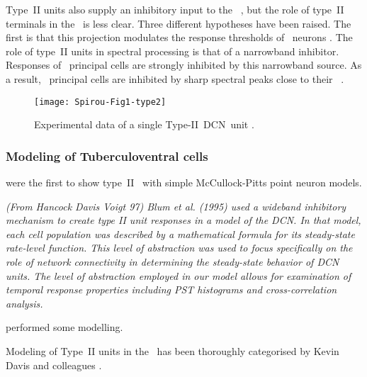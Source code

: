
Type~II units also supply an inhibitory input to the
\VCN~\citep{WickesbergOertel:1990}, but the role of type~II terminals in the
\VCN~is less clear. Three different hypotheses have been raised. The ﬁrst is
that this projection modulates the response thresholds of \VCN~neurons
\citep{PaoliniClark:1998}.  The role of type~II units in spectral processing is
that of a narrowband inhibitor. Responses of \DCN~principal cells are strongly
inhibited by this narrowband source. As a result, \DCN~principal cells are
inhibited by sharp spectral peaks close to their
\BF~\citep{SpirouDavisEtAl:1999}.


\begin{figure}[htb]
  \centering
  \texttt{[image: Spirou-Fig1-type2]}
  \caption[Experimental data of a single Type-II~DCN~unit]{Experimental data of
    a single Type-II~DCN~unit \citep[Fig.~1]{SpirouDavisEtAl:1999}.}
  \label{fig:SpirouFig1}
\end{figure}


\subsubsection{Modeling of Tuberculoventral cells}



\citet{ArleKim:1991a} were the first to show type~II \EIRA~with simple
McCullock-Pitts point neuron models.


{\it (From Hancock Davis Voigt 97) Blum et al. (1995) used a wideband inhibitory
  mechanism to create type II unit responses in a model of the DCN. In that
  model, each cell population was described by a mathematical formula for its
  steady-state rate-level function. This level of abstraction was used to focus
  specifically on the role of network connectivity in determining the
  steady-state behavior of DCN units. The level of abstraction employed in our
  model allows for examination of temporal response properties including PST
  histograms and cross-correlation analysis.}

\citep{DunnVetterEtAl:1996} performed some modelling.


Modeling of Type~II units in the \DCN~has been thoroughly categorised by Kevin
Davis and colleagues \citep{YoungDavis:2002,HancockDavisEtAl:2001,DavisYoung:2000,SpirouDavisEtAl:1999,HancockDavisEtAl:1997,DavisVoigt:1996,DavisVoigt:1994,DavisVoigt:1991}.

